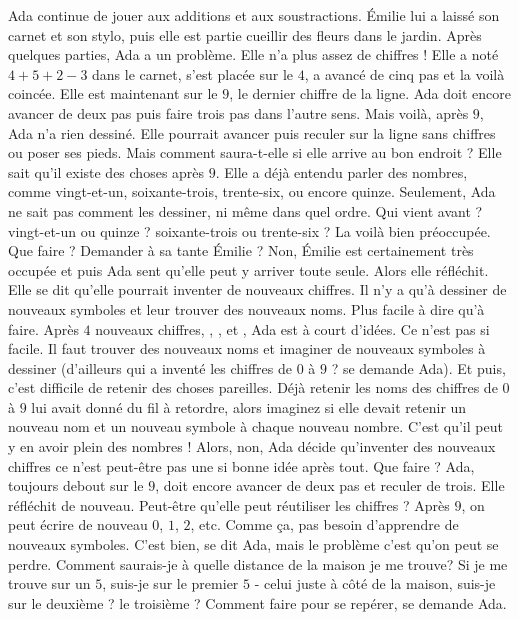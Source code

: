 Ada continue de jouer aux additions et aux soustractions. 
Émilie lui a laissé son carnet et son stylo, puis elle est partie cueillir des fleurs dans le jardin. 
Après quelques parties, Ada a un problème. 
Elle n’a plus assez de chiffres ! 
Elle a noté $4 + 5 + 2 - 3$ dans le carnet, s’est placée sur le $4$, a avancé de cinq pas et la voilà coincée. 
Elle est maintenant sur le $9$, le dernier chiffre de la ligne. 
Ada doit encore avancer de deux pas puis faire trois pas dans l’autre sens.
Mais voilà, après $9$, Ada n’a rien dessiné.
Elle pourrait avancer puis reculer sur la ligne sans chiffres ou poser ses pieds. Mais comment saura-t-elle si elle arrive au bon endroit ? 
Elle sait qu’il existe des choses après $9$. 
Elle a déjà entendu parler des nombres, comme vingt-et-un, soixante-trois, trente-six, ou encore quinze. 
Seulement, Ada ne sait pas comment les dessiner, ni même dans quel ordre.
Qui vient avant ? vingt-et-un ou quinze ? soixante-trois ou trente-six ?
La voilà bien préoccupée. Que faire ? Demander à sa tante Émilie ? Non, Émilie est certainement très occupée et puis Ada sent qu’elle peut y arriver toute seule. Alors elle réfléchit. Elle se dit qu’elle pourrait inventer de nouveaux chiffres. 
Il n’y a qu'à dessiner de nouveaux symboles et leur trouver des nouveaux noms. Plus facile à dire qu'à faire. Après $4$ nouveaux chiffres, , ,  et , Ada est à court d'idées. 
Ce n’est pas si facile. Il faut trouver des nouveaux noms et imaginer de nouveaux symboles à dessiner (d’ailleurs qui a inventé les chiffres de $0$ à $9$ ? se demande Ada). Et puis, c’est difficile de retenir des choses pareilles. Déjà retenir les noms des chiffres de $0$ à $9$ lui avait donné du fil à retordre, alors imaginez si elle devait retenir un nouveau nom et un nouveau symbole à chaque nouveau nombre.
C’est qu’il peut y en avoir plein des nombres ! 
Alors, non, Ada décide qu’inventer des nouveaux chiffres ce n’est peut-être pas une si bonne idée après tout. 
Que faire ? Ada, toujours debout sur le $9$, doit encore avancer de deux pas et reculer de trois. Elle réfléchit de nouveau. Peut-être qu’elle peut réutiliser les chiffres ? 
Après $9$, on peut écrire de nouveau $0$, $1$, $2$, etc. Comme ça, pas besoin d’apprendre de nouveaux symboles. C’est bien, se dit Ada, mais le problème c’est qu’on peut se perdre. 
Comment saurais-je à quelle distance de la maison je me trouve? Si je me trouve sur un $5$, suis-je sur le premier $5$ - celui juste à côté de la maison, suis-je sur le deuxième ? le troisième ? Comment faire pour se repérer, se demande Ada.
